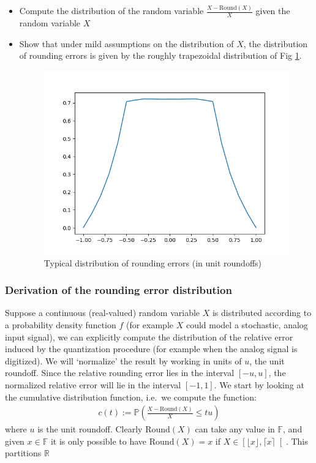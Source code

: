 \documentclass[10pt,conference]{IEEEtran}
\newcommand{\ie}{i.e.\ }
\newcommand{\round}{\mathrm{Round}}
\newcommand{\Pro}{\mathbb{P}}
\newcommand{\F}{\mathbb{F}}
\newcommand{\R}{\mathbb{R}}
\newcommand{\ceil}[1]{\lceil #1 \rceil}
\newcommand{\floor}[1]{\lfloor #1 \rfloor}
\begin{document}
\begin{itemize}
\item Compute the distribution of the random variable $\frac{X-\round(X)}{X}$ given the random variable $X$
\item Show that under mild assumptions on the distribution of $X$, the distribution of rounding errors is given by the roughly trapezoidal distribution of Fig \ref{fig:trapeze}.
\begin{figure}[ht!]
\includegraphics[scale=0.55]{trapeze_dist}
\caption{Typical distribution of rounding errors (in unit roundoffs)}
\label{fig:trapeze}
\end{figure}
\end{itemize}


\subsubsection{Derivation of the rounding error distribution}
Suppose a continuous (real-valued) random variable $X$ is distributed according to a probability density function $f$ (for example $X$ could model a stochastic, analog input signal), we can explicitly compute the distribution of the relative error induced by the quantization procedure (for example when the analog signal is digitized). We will `normalize' the result by working in units of $u$, the unit roundoff. Since the relative rounding error lies in the interval $[-u,u]$, the normalized relative error will lie in the interval $[-1,1]$.  We start by looking at the cumulative distribution function, \ie we compute the function:
\begin{align*}
c(t):=\Pro\left(\frac{X-\round(X)}{X}\leq tu\right)
\end{align*}
where $u$ is the unit roundoff. Clearly $\round(X)$ can take any value in $\F$, and given $x\in\F$ it is only possible to have $\round(X)=x$ if $X\in \left[\floor{x},\ceil{x}\right[$. This partitions $\R$
\end{document}
